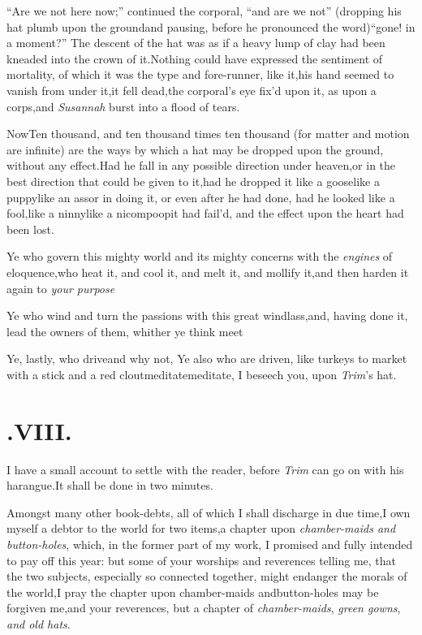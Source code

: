\documentclass{article}
\begin{document}
\enlargethispage\baselineskip
\tsh  “Are we not here now;”\tsk\break
continued the corporal, “and are we not”\break
\tsk (dropping his hat plumb upon the ground\tsk and
pausing, before he pronounced the word)\tsk “gone! in a
moment?” The descent of the hat was as if a heavy lump of
clay had been kneaded into the crown of it.\tsh Nothing
could have expressed the sentiment of mortality, of which it
was the type and fore-runner, like it,\tsk his hand seemed
to vanish from under it,\tsk it fell dead,\tsk the
corporal’s eye fix’d upon it, as upon a corps,\tsk and
\textit{Susannah} burst into a flood of tears.

\vskip-3pt

Now\tsk Ten thousand, and ten thousand times ten thousand
(for matter and motion are infinite) are the ways by\break
which a hat may be dropped upon the ground, without any
effect.\tsk Had he 
fall in any
possible direction under hea\-ven,\tsk or in the best
direction that could be given to it,\tsk had he dropped it
like a goose\tsk like a puppy\tsk like an ass\tsk or in
doing it, or even after he had done, had he looked like a
fool,\tsk like a ninny\tsk like a nicompoop\sic\tsk it had
fail’d, and the effect upon the heart had been lost.

\vskip-3pt

Ye who govern this mighty world and its mighty concerns with the
\textit{engines} of eloquence,\tsk who heat it, and cool it, and melt it,
and mollify it,\tsh and then harden it again to \textit{your
purpose}\tsh{}

Ye who wind and turn the passions with this great
windlass,\tsk and, having done it, lead the owners of them,
whither ye think meet\tsk

Ye, lastly, who drive\tsk\tsk and why not, Ye also who are
driven, like turkeys to market with a stick and a red
clout\tsk meditate\tsk meditate, I beseech you, upon
\textit{Trim}’s hat.

\section{.\enspace  VIII.}

\tsh I have a small account to
settle with the reader, before \textit{Trim} can go on with his
harangue.\tsk It shall be done in two minutes.

Amongst many other book-debts, all of which I shall discharge in
due time,\tsk I own myself a debtor to the world for two
items,\tsk a chapter upon \textit{chamber-maids and button-holes},
which, in the former part of my work, I promised and fully intended
to pay off this year: but some of your worships and reverences
telling me, that the two subjects, especially so connected
together, might endanger the morals of the world,\tsk I pray the
chapter upon chamber-maids and\break button-holes may be forgiven
me,\tsk and 
your reverences, but a chapter of \textit{cham\-ber-maids}, 
\textit{green gowns}, \textit{and old hats}.
\end{document}
